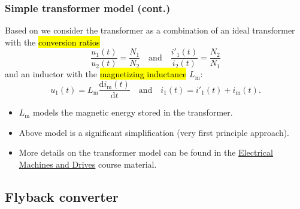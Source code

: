 \begin{frame}
	\frametitle{Simple transformer model (cont.)}
	Based on  we consider the transformer as a combination of an ideal transformer with the \hl{conversion ratios}
	\begin{equation}
		\frac{u_1(t)}{u_2(t)} = \frac{N_1}{N_2} \quad \text{and} \quad \frac{i'_1(t)}{i_2(t)} = \frac{N_2}{N_1}
	\end{equation}\pause%
	and an inductor with the \hl{magnetizing inductance} $L_\mathrm{m}$:
	\begin{equation}
		u_1(t) = L_\mathrm{m} \frac{\mathrm{d}i_\mathrm{m}(t)}{\mathrm{d}t} \quad \text{and} \quad i_1(t) = i'_1(t) + i_\mathrm{m}(t).
	\end{equation}\pause %
	\begin{itemize}
		\item<3-> $L_\mathrm{m}$ models the magnetic energy stored in the transformer.
		\item<4-> Above model is a significant simplification (very first principle approach).
		\item<5-> More details on the transformer model can be found in the \href{https://github.com/IAS-Uni-Siegen/EMD_course}{Electrical Machines and Drives} course material.
	\end{itemize}
\end{frame}

\subsection{Flyback converter}

